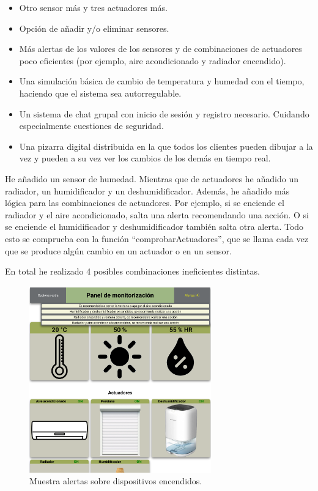 \documentclass{article}
\begin{document}
\begin{itemize}
    \item Otro sensor más y tres actuadores más.
    \item Opción de añadir y/o eliminar sensores.
    \item Más alertas de los valores de los sensores y de combinaciones de actuadores poco eficientes (por ejemplo, aire acondicionado y radiador encendido).
    \item Una simulación básica de cambio de temperatura y humedad con el tiempo, haciendo que el sistema sea autorregulable.
    \item Un sistema de chat grupal con inicio de sesión y registro necesario. Cuidando especialmente cuestiones de seguridad.
    \item Una pizarra digital distribuida en la que todos los clientes pueden dibujar a la vez y pueden a su vez ver los cambios de los demás en tiempo real.
\end{itemize}

He añadido un sensor de humedad. Mientras que de actuadores he añadido un radiador, un humidificador y un deshumidificador. Además, he añadido más lógica para las combinaciones de actuadores. Por ejemplo, si se enciende el radiador y el aire acondicionado, salta una alerta recomendando una acción. O si se enciende el humidificador y deshumidificador también salta otra alerta. Todo esto se comprueba con la función ``comprobarActuadores'', que se llama cada vez que se produce algún cambio en un actuador o en un sensor.

\bigskip

En total he realizado 4 posibles combinaciones ineficientes distintas.

\begin{figure}[H]
    \centering
    \includegraphics[width=0.7\textwidth]{images/actuadoresmal.png}
    \caption{Muestra alertas sobre dispositivos encendidos.}
\end{figure}
\end{document}
